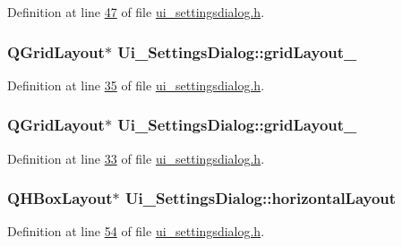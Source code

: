 Definition at line \hyperlink{a00054_source_l00047}{47} of file \hyperlink{a00054_source}{ui\+\_\+settingsdialog.\+h}.

\hypertarget{a00029_a7b71d6038a34f600625f007630c5234e}{
\subsubsection[{grid\+Layout\+\_\+2}]{\setlength{\rightskip}{0pt plus 5cm}Q\+Grid\+Layout$\ast$ Ui\+\_\+\+Settings\+Dialog\+::grid\+Layout\+\_}}\label{a00029_a7b71d6038a34f600625f007630c5234e}


Definition at line \hyperlink{a00054_source_l00035}{35} of file \hyperlink{a00054_source}{ui\+\_\+settingsdialog.\+h}.

\hypertarget{a00029_a2cc53955b73f22f0cfcf508da4654b16}{
\subsubsection[{grid\+Layout\+\_\+3}]{\setlength{\rightskip}{0pt plus 5cm}Q\+Grid\+Layout$\ast$ Ui\+\_\+\+Settings\+Dialog\+::grid\+Layout\+\_}}\label{a00029_a2cc53955b73f22f0cfcf508da4654b16}


Definition at line \hyperlink{a00054_source_l00033}{33} of file \hyperlink{a00054_source}{ui\+\_\+settingsdialog.\+h}.

\hypertarget{a00029_a5519b84cf0fd4124e77643ce5600a251}{
\subsubsection[{horizontal\+Layout}]{\setlength{\rightskip}{0pt plus 5cm}Q\+H\+Box\+Layout$\ast$ Ui\+\_\+\+Settings\+Dialog\+::horizontal\+Layout}}\label{a00029_a5519b84cf0fd4124e77643ce5600a251}


Definition at line \hyperlink{a00054_source_l00054}{54} of file \hyperlink{a00054_source}{ui\+\_\+settingsdialog.\+h}.

